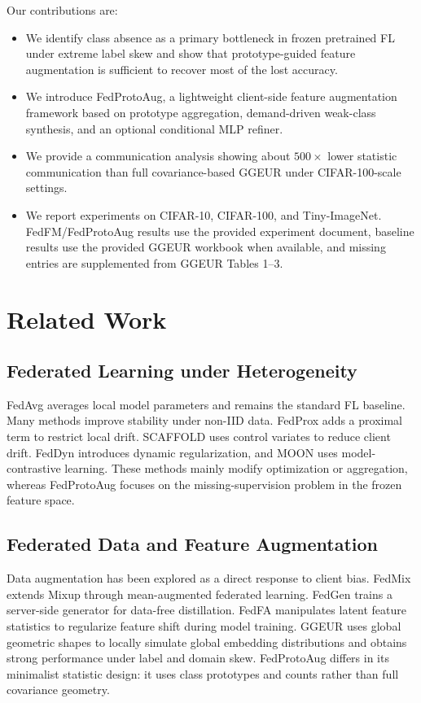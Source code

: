 ﻿\documentclass[runningheads]{llncs}
\newcommand{\method}{FedProtoAug}
\begin{document}
Our contributions are:
\begin{itemize}
    \item We identify class absence as a primary bottleneck in frozen pretrained FL under extreme label skew and show that prototype-guided feature augmentation is sufficient to recover most of the lost accuracy.
    \item We introduce \method, a lightweight client-side feature augmentation framework based on prototype aggregation, demand-driven weak-class synthesis, and an optional conditional MLP refiner.
    \item We provide a communication analysis showing about $500\times$ lower statistic communication than full covariance-based GGEUR under CIFAR-100-scale settings.
    \item We report experiments on CIFAR-10, CIFAR-100, and Tiny-ImageNet. FedFM/FedProtoAug results use the provided experiment document, baseline results use the provided GGEUR workbook when available, and missing entries are supplemented from GGEUR Tables 1--3.
\end{itemize}

\section{Related Work}

\subsection{Federated Learning under Heterogeneity}
FedAvg \cite{mcmahan2017fedavg} averages local model parameters and remains the standard FL baseline. Many methods improve stability under non-IID data. FedProx \cite{li2020fedprox} adds a proximal term to restrict local drift. SCAFFOLD \cite{karimireddy2020scaffold} uses control variates to reduce client drift. FedDyn \cite{acar2021feddyn} introduces dynamic regularization, and MOON \cite{li2021moon} uses model-contrastive learning. These methods mainly modify optimization or aggregation, whereas \method{} focuses on the missing-supervision problem in the frozen feature space.

\subsection{Federated Data and Feature Augmentation}
Data augmentation has been explored as a direct response to client bias. FedMix \cite{yoon2021fedmix} extends Mixup through mean-augmented federated learning. FedGen \cite{zhu2021fedgen} trains a server-side generator for data-free distillation. FedFA \cite{zhou2023fedfa} manipulates latent feature statistics to regularize feature shift during model training. GGEUR \cite{ma2025ggeur} uses global geometric shapes to locally simulate global embedding distributions and obtains strong performance under label and domain skew. \method{} differs in its minimalist statistic design: it uses class prototypes and counts rather than full covariance geometry.
\end{document}
